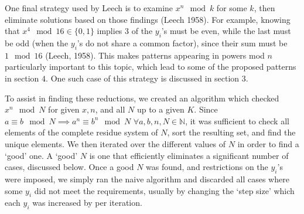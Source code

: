 \documentclass{article}
\begin{document}
\begin{flushleft}
\vspace{.1in}

One final strategy used by Leech is to examine $x^n \mod k$ for some $k$, then eliminate solutions based on those findings (Leech 1958). For example, knowing that $x^4 \mod 16 \in \{0, 1\}$ implies $3$ of the $y_i$'s must be even, while the last must be odd (when the $y_i$'s do not share a common factor), since their sum must be $1 \mod 16$ (Leech, 1958). This makes patterns appearing in powers mod $n$ particularly important to this topic, which lead to some of the proposed patterns in section $4$. One such case of this strategy is discussed in section $3$.

\vspace{.1in}

To assist in finding these reductions, we created an algorithm which checked $x^n \mod N$ for given $x, n$, and all $N$ up to a given $K$. Since $a \equiv b \mod N \implies a^n \equiv b^n \mod N$ $\forall a, b, n, N \in \mathbb{N}$, it was sufficient to check all elements of the complete residue system of $N$, sort the resulting set, and find the unique elements. We then iterated over the different values of $N$ in order to find a `good' one. A `good' $N$ is one that efficiently eliminates a significant number of cases, discussed below. Once a good $N$ was found, and restrictions on the $y_i$'s were imposed, we simply ran the naive algorithm and discarded all cases where some $y_i$ did not meet the requirements, usually by changing the `step size' which each $y_i$ was increased by per iteration.


\end{flushleft}
\end{document}
